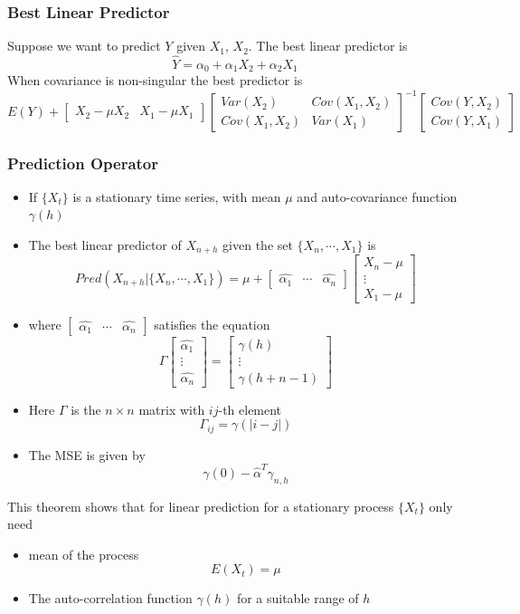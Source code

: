 \documentclass[11pt]{article}
\newcommand{\cv}[1]{\begin{bmatrix} #1 \end{bmatrix}}
\begin{document}
\subsubsection{Best Linear Predictor}
Suppose we want to predict $Y$ given $X_1$, $X_2$. The best linear predictor is 
\[\hat{Y} = \alpha_0 + \alpha_1X_2 + \alpha_2X_1\]    
When covariance is non-singular the best predictor is 
\[E(Y) + \cv{X_2-\mu X_2 & X_1-\mu X_1}\cv{Var(X_2) & Cov(X_1,X_2)\\Cov(X_1,X_2) & Var(X_1)}^{-1}\cv{Cov(Y,X_2)\\Cov(Y,X_1)}\]
\subsubsection{Prediction Operator}
\begin{itemize}
    \item If $\{X_t\}$ is a stationary time series, with mean $\mu$ and auto-covariance function $\gamma(h)$
    \item The best linear predictor of $X_{n+h}$ given the set $\{X_n,\cdots,X_1\}$ is
    \[Pred(X_{n+h}|\{X_n,\cdots,X_1\}) = \mu + \cv{\hat{\alpha_1}&\cdots&\hat{\alpha_n}}\cv{X_n-\mu\\\vdots\\X_1-\mu}\]   
    \item where $\cv{\hat{\alpha_1}&\cdots&\hat{\alpha_n}}$ satisfies the equation 
    \[\Gamma\cv{\hat{\alpha_1}\\\vdots\\\hat{\alpha_n}} = \cv{\gamma(h)\\\vdots\\\gamma(h+n-1)}\]
    \item Here $\Gamma$ is the $n\times n$ matrix with $ij$-th element \[\Gamma_{ij} = \gamma(|i-j|)\]    
    \item The MSE is given by \[\gamma(0) - \hat{\alpha}^T\gamma_{n,h}\]     
\end{itemize}
This theorem shows that for linear prediction for a stationary process $\{X_t\}$ only need 
\begin{itemize}
    \item mean of the process \[E(X_t)=\mu\]    
    \item The auto-correlation function $\gamma(h)$ for a suitable range of $h$
\end{itemize}
\end{document}
